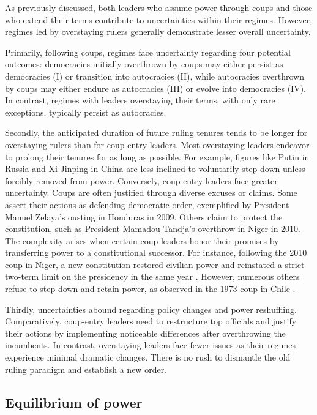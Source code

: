 \documentclass[
  12pt,
  a4paper,
  12pt]{article}
\begin{document}
As previously discussed, both leaders who assume power through coups and
those who extend their terms contribute to uncertainties within their
regimes. However, regimes led by overstaying rulers generally
demonstrate lesser overall uncertainty.

Primarily, following coups, regimes face uncertainty regarding four
potential outcomes: democracies initially overthrown by coups may either
persist as democracies (I) or transition into autocracies (II), while
autocracies overthrown by coups may either endure as autocracies (III)
or evolve into democracies (IV). In contrast, regimes with leaders
overstaying their terms, with only rare exceptions, typically persist as
autocracies.

Secondly, the anticipated duration of future ruling tenures tends to be
longer for overstaying rulers than for coup-entry leaders. Most
overstaying leaders endeavor to prolong their tenures for as long as
possible. For example, figures like Putin in Russia and Xi Jinping in
China are less inclined to voluntarily step down unless forcibly removed
from power. Conversely, coup-entry leaders face greater uncertainty.
Coups are often justified through diverse excuses or claims. Some assert
their actions as defending democratic order, exemplified by President
Manuel Zelaya's ousting in Honduras in 2009. Others claim to protect the
constitution, such as President Mamadou Tandja's overthrow in Niger in
2010. The complexity arises when certain coup leaders honor their
promises by transferring power to a constitutional successor. For
instance, following the 2010 coup in Niger, a new constitution restored
civilian power and reinstated a strict two-term limit on the presidency
in the same year \citep{ginsburg2019}. However, numerous others refuse
to step down and retain power, as observed in the 1973 coup in Chile
\citep{ökten2022}.

Thirdly, uncertainties abound regarding policy changes and power
reshuffling. Comparatively, coup-entry leaders need to restructure top
officials and justify their actions by implementing noticeable
differences after overthrowing the incumbents. In contrast, overstaying
leaders face fewer issues as their regimes experience minimal dramatic
changes. There is no rush to dismantle the old ruling paradigm and
establish a new order.

\hypertarget{equilibrium-of-power}{%
\subsection{Equilibrium of power}\label{equilibrium-of-power}}
\end{document}
